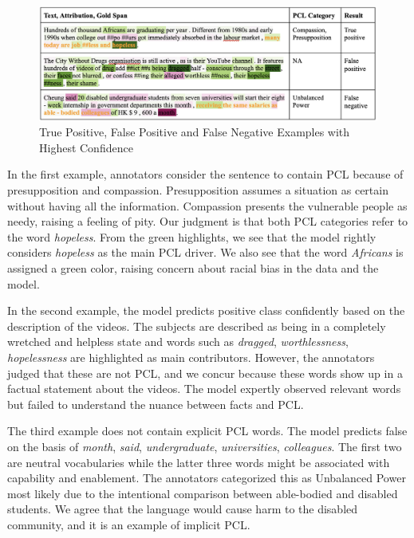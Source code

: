 \documentclass[11pt]{article}
\begin{document}
\begin{figure}
    \centering
    \includegraphics[width=16cm]{Fig 1.png}
    \caption{True Positive, False Positive and False Negative Examples with Highest Confidence}
    \label{fig:fig1}
\end{figure}

In the first example, annotators consider the sentence to contain PCL because of presupposition and compassion. Presupposition assumes a situation as certain without having all the information. Compassion presents the vulnerable people as needy, raising a feeling of pity. Our judgment is that both PCL categories refer to the word \textit{hopeless}. From the green highlights, we see that the model rightly considers \textit{hopeless} as the main PCL driver. We also see that the word \textit{Africans} is assigned a green color, raising concern about racial bias in the data and the model.

In the second example, the model predicts positive class confidently based on the description of the videos. The subjects are described as being in a completely wretched and helpless state and words such as \textit{dragged}, \textit{worthlessness}, \textit{hopelessness} are highlighted as main contributors. However, the annotators judged that these are not PCL, and we concur because these words show up in a factual statement about the videos. The model expertly observed relevant words but failed to understand the nuance between facts and PCL.

The third example does not contain explicit PCL words. The model predicts false on the basis of \textit{month}, \textit{said}, \textit{undergraduate}, \textit{universities}, \textit{colleagues}. The first two are neutral vocabularies while the latter three words might be associated with capability and enablement. The annotators categorized this as Unbalanced Power most likely due to the intentional comparison between able-bodied and disabled students. We agree that the language would cause harm to the disabled community, and it is an example of implicit PCL.
\end{document}
